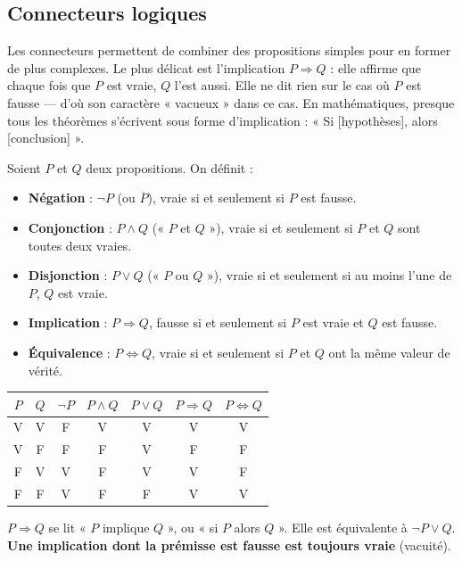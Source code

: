 \documentclass[11pt,a4paper,twoside]{book}
\begin{document}
\subsection{Connecteurs logiques}

Les connecteurs permettent de combiner des propositions simples pour en former de plus complexes. Le plus délicat est l'implication $P \Rightarrow Q$ : elle affirme que chaque fois que $P$ est vraie, $Q$ l'est aussi. Elle ne dit rien sur le cas où $P$ est fausse — d'où son caractère « vacueux » dans ce cas. En mathématiques, presque tous les théorèmes s'écrivent sous forme d'implication : « Si [hypothèses], alors [conclusion] ».

\begin{definitionbox}
Soient $P$ et $Q$ deux propositions. On définit :
\begin{itemize}
  \item \textbf{Négation} : $\neg P$ (ou $\overline{P}$), vraie si et seulement si $P$ est fausse.
  \item \textbf{Conjonction} : $P \land Q$ (« $P$ et $Q$ »), vraie si et seulement si $P$ et $Q$
        sont toutes deux vraies.
  \item \textbf{Disjonction} : $P \lor Q$ (« $P$ ou $Q$ »), vraie si et seulement si au moins
        l'une de $P$, $Q$ est vraie.
  \item \textbf{Implication} : $P \Rightarrow Q$, fausse si et seulement si $P$ est vraie et $Q$
        est fausse.
  \item \textbf{Équivalence} : $P \Leftrightarrow Q$, vraie si et seulement si $P$ et $Q$ ont la
        même valeur de vérité.
\end{itemize}
\end{definitionbox}

\begin{center}
\begin{tabular}{cc|ccccc}
\toprule
$P$ & $Q$ & $\neg P$ & $P \land Q$ & $P \lor Q$ & $P \Rightarrow Q$ & $P \Leftrightarrow Q$ \\
\midrule
V & V & F & V & V & V & V \\
V & F & F & F & V & F & F \\
F & V & V & F & V & V & F \\
F & F & V & F & F & V & V \\
\bottomrule
\end{tabular}
\end{center}

\begin{remarquebox}[Implication]
$P \Rightarrow Q$ se lit « $P$ implique $Q$ », ou « si $P$ alors $Q$ ». Elle est équivalente à
$\neg P \lor Q$. \textbf{Une implication dont la prémisse est fausse est toujours vraie}
(vacuité).
\end{remarquebox}
\end{document}
